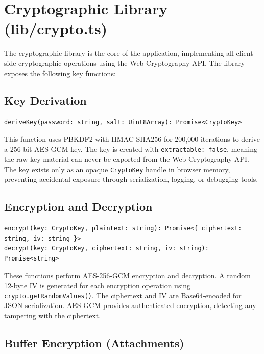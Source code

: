 \section{Cryptographic Library (lib/crypto.ts)}

The cryptographic library is the core of the application, implementing all client-side cryptographic operations using the Web Cryptography API. The library exposes the following key functions:

\subsection{Key Derivation}

\begin{verbatim}
deriveKey(password: string, salt: Uint8Array): Promise<CryptoKey>
\end{verbatim}

This function uses PBKDF2 with HMAC-SHA256 for 200,000 iterations to derive a 256-bit AES-GCM key. The key is created with \texttt{extractable: false}, meaning the raw key material can never be exported from the Web Cryptography API. The key exists only as an opaque \texttt{CryptoKey} handle in browser memory, preventing accidental exposure through serialization, logging, or debugging tools.

\subsection{Encryption and Decryption}

\begin{verbatim}
encrypt(key: CryptoKey, plaintext: string): Promise<{ ciphertext: string, iv: string }>
decrypt(key: CryptoKey, ciphertext: string, iv: string): Promise<string>
\end{verbatim}

These functions perform AES-256-GCM encryption and decryption. A random 12-byte IV is generated for each encryption operation using \texttt{crypto.getRandomValues()}. The ciphertext and IV are Base64-encoded for JSON serialization. AES-GCM provides authenticated encryption, detecting any tampering with the ciphertext.

\subsection{Buffer Encryption (Attachments)}

